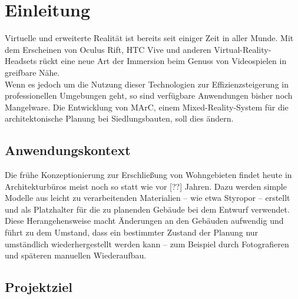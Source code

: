 \section{Einleitung}
Virtuelle und erweiterte Realität ist bereits seit einiger Zeit in aller Munde. Mit dem Erscheinen von Oculus Rift, HTC Vive und anderen Virtual-Reality-Headsets rückt eine neue Art der Immersion beim Genuss von Videospielen in greifbare Nähe.\\
Wenn es jedoch um die Nutzung dieser Technologien zur Effizienzsteigerung in professionellen Umgebungen geht, so sind verfügbare Anwendungen bisher noch Mangelware.
Die Entwicklung von MArC, einem Mixed-Reality-System für die architektonische Planung bei Siedlungsbauten, soll dies ändern.
\subsection{Anwendungskontext}
Die frühe Konzeptionierung zur Erschließung von Wohngebieten findet heute in Architekturbüros meist noch so statt wie vor {\color{red}[??]} Jahren. Dazu werden simple Modelle aus leicht zu verarbeitenden Materialien -- wie etwa Styropor -- erstellt und als Platzhalter für die zu planenden Gebäude bei dem Entwurf verwendet.\\
Diese Herangehensweise macht Änderungen an den Gebäuden aufwendig und führt zu dem Umstand, dass ein bestimmter Zustand der Planung nur umständlich wiederhergestellt werden kann -- zum Beispiel durch Fotografieren und späteren manuellen Wiederaufbau.
\subsection{Projektziel}